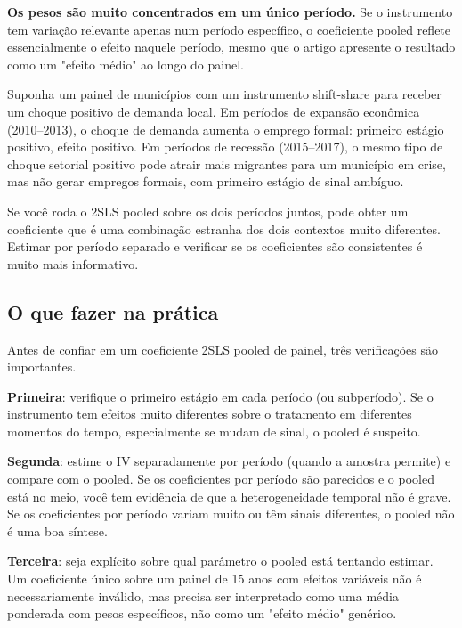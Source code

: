 \textbf{Os pesos são muito concentrados em um único período.} Se o instrumento tem variação relevante apenas num período específico, o coeficiente pooled reflete essencialmente o efeito naquele período, mesmo que o artigo apresente o resultado como um "efeito médio" ao longo do painel.

\begin{exemplobox}
Suponha um painel de municípios com um instrumento shift-share para receber um choque positivo de demanda local. Em períodos de expansão econômica (2010--2013), o choque de demanda aumenta o emprego formal: primeiro estágio positivo, efeito positivo. Em períodos de recessão (2015--2017), o mesmo tipo de choque setorial positivo pode atrair mais migrantes para um município em crise, mas não gerar empregos formais, com primeiro estágio de sinal ambíguo.

Se você roda o 2SLS pooled sobre os dois períodos juntos, pode obter um coeficiente que é uma combinação estranha dos dois contextos muito diferentes. Estimar por período separado e verificar se os coeficientes são consistentes é muito mais informativo.
\end{exemplobox}

\subsection*{O que fazer na prática}

Antes de confiar em um coeficiente 2SLS pooled de painel, três verificações são importantes.

\textbf{Primeira}: verifique o primeiro estágio em cada período (ou subperíodo). Se o instrumento tem efeitos muito diferentes sobre o tratamento em diferentes momentos do tempo, especialmente se mudam de sinal, o pooled é suspeito.

\textbf{Segunda}: estime o IV separadamente por período (quando a amostra permite) e compare com o pooled. Se os coeficientes por período são parecidos e o pooled está no meio, você tem evidência de que a heterogeneidade temporal não é grave. Se os coeficientes por período variam muito ou têm sinais diferentes, o pooled não é uma boa síntese.

\textbf{Terceira}: seja explícito sobre qual parâmetro o pooled está tentando estimar. Um coeficiente único sobre um painel de 15 anos com efeitos variáveis não é necessariamente inválido, mas precisa ser interpretado como uma média ponderada com pesos específicos, não como um "efeito médio" genérico.

